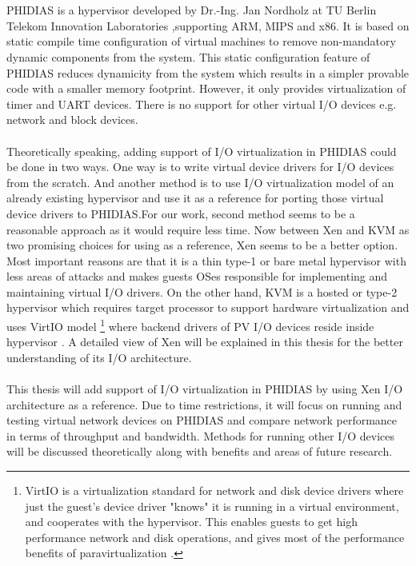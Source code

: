 \\
\\
PHIDIAS is a hypervisor developed by Dr.-Ing. Jan Nordholz at TU Berlin Telekom Innovation Laboratories \cite{Jan},supporting ARM, MIPS and x86. It is based on static compile time configuration of virtual machines to remove non-mandatory dynamic components from the system. This static configuration feature of PHIDIAS reduces dynamicity from the system which results in a simpler provable code with a smaller memory footprint. However, it only provides virtualization of timer and UART devices. There is no support for other virtual I/O devices e.g. network and block devices.
\\
\\
Theoretically speaking, adding support of I/O virtualization in PHIDIAS could be done in two ways. One way is to write virtual device drivers for I/O devices from the scratch. And another method is to use I/O virtualization model of an already existing hypervisor and use it as a reference for porting those virtual device drivers to PHIDIAS.For our work, second method seems to be a reasonable approach as it would require less time. Now between Xen and KVM as two promising choices for using as a reference, Xen seems to be a better option. Most important reasons are that it is a thin type-1 or bare metal hypervisor with less areas of attacks and makes guests OSes responsible for implementing and maintaining virtual I/O drivers. On the other hand, KVM is a hosted or type-2 hypervisor which requires target processor to support hardware virtualization and uses VirtIO model \footnote{VirtIO is a virtualization standard for network and disk device drivers where just the guest's device driver "knows" it is running in a virtual environment, and cooperates with the hypervisor. This enables guests to get high performance network and disk operations, and gives most of the performance benefits of paravirtualization \cite{virtio}.} where backend drivers of PV I/O devices reside inside hypervisor \cite{kvm}.  A detailed view of Xen will be explained in this thesis for the better understanding of its I/O architecture.
\\
\\
This thesis will add support of I/O virtualization in PHIDIAS by using Xen I/O architecture as a reference. Due to time restrictions, it will focus on running and testing virtual network devices on PHIDIAS and compare network performance in terms of throughput and bandwidth. Methods for running other I/O devices will be discussed theoretically along with benefits and areas of future research.

